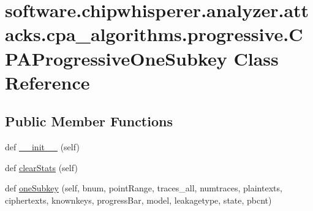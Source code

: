 \hypertarget{classsoftware_1_1chipwhisperer_1_1analyzer_1_1attacks_1_1cpa__algorithms_1_1progressive_1_1CPAProgressiveOneSubkey}{}\section{software.\+chipwhisperer.\+analyzer.\+attacks.\+cpa\+\_\+algorithms.\+progressive.\+C\+P\+A\+Progressive\+One\+Subkey Class Reference}
\label{classsoftware_1_1chipwhisperer_1_1analyzer_1_1attacks_1_1cpa__algorithms_1_1progressive_1_1CPAProgressiveOneSubkey}
\subsection*{Public Member Functions}
\begin{DoxyCompactItemize}
\item 
def \hyperlink{classsoftware_1_1chipwhisperer_1_1analyzer_1_1attacks_1_1cpa__algorithms_1_1progressive_1_1CPAProgressiveOneSubkey_a11a705e73f7c624060fe14ae1593568f}{\+\_\+\+\_\+init\+\_\+\+\_\+} (self)
\item 
def \hyperlink{classsoftware_1_1chipwhisperer_1_1analyzer_1_1attacks_1_1cpa__algorithms_1_1progressive_1_1CPAProgressiveOneSubkey_a3b4ddd23425b078c79417c9afd490380}{clear\+Stats} (self)
\item 
def \hyperlink{classsoftware_1_1chipwhisperer_1_1analyzer_1_1attacks_1_1cpa__algorithms_1_1progressive_1_1CPAProgressiveOneSubkey_aae409c56b8087a4dd5a3b1bc9d5fad20}{one\+Subkey} (self, bnum, point\+Range, traces\+\_\+all, numtraces, plaintexts, ciphertexts, knownkeys, progress\+Bar, model, leakagetype, state, pbcnt)
\end{DoxyCompactItemize}
